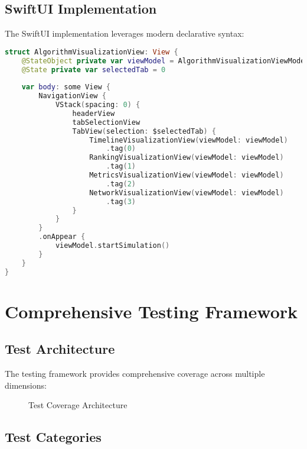 \documentclass[11pt,a4paper]{article}
\begin{document}
\subsection{SwiftUI Implementation}

The SwiftUI implementation leverages modern declarative syntax:

\begin{lstlisting}[language=Swift, caption=SwiftUI Visualization Implementation]
struct AlgorithmVisualizationView: View {
    @StateObject private var viewModel = AlgorithmVisualizationViewModel()
    @State private var selectedTab = 0
    
    var body: some View {
        NavigationView {
            VStack(spacing: 0) {
                headerView
                tabSelectionView
                TabView(selection: $selectedTab) {
                    TimelineVisualizationView(viewModel: viewModel)
                        .tag(0)
                    RankingVisualizationView(viewModel: viewModel)
                        .tag(1)
                    MetricsVisualizationView(viewModel: viewModel)
                        .tag(2)
                    NetworkVisualizationView(viewModel: viewModel)
                        .tag(3)
                }
            }
        }
        .onAppear {
            viewModel.startSimulation()
        }
    }
}
\end{lstlisting}

\section{Comprehensive Testing Framework}

\subsection{Test Architecture}

The testing framework provides comprehensive coverage across multiple dimensions:

\begin{figure}[H]
    \centering
    \caption{Test Coverage Architecture}
    \label{fig:test-coverage}
\end{figure}

\subsection{Test Categories}
\end{document}
